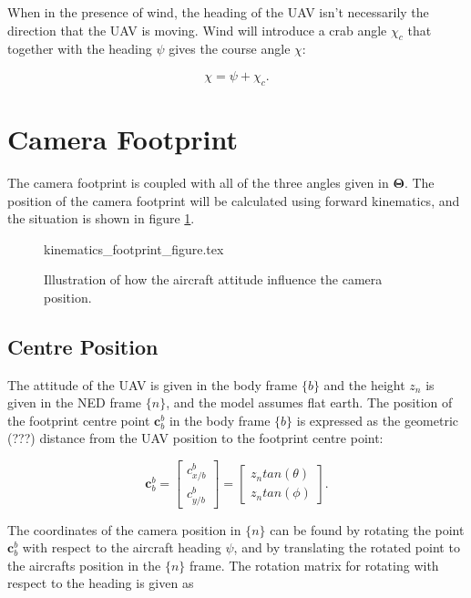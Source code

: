
When in the presence of wind, the heading of the UAV isn't necessarily the direction that the UAV is moving. Wind will introduce a crab angle $\chi_c$ that together with the heading $\psi$ gives the course angle $\chi$:

\begin{equation}
	\chi = \psi + \chi_c.
\end{equation}


\section{Camera Footprint}

The camera footprint is coupled with all of the three angles given in $\bm{\Theta}$. The position of the camera footprint will be calculated using forward kinematics, and the situation is shown in figure \ref{fig:footprint_centre}.

\begin{figure}
	{kinematics_footprint_figure.tex}
	\caption{Illustration of how the aircraft attitude influence the camera position.}
	\label{fig:footprint_centre}
\end{figure}

\subsection{Centre Position}

The attitude of the UAV is given in the body frame $\{b\}$ and the height $z_n$ is given in the NED frame $\{n\}$, and the model assumes flat earth. The position of the footprint centre point $\mathbf{c}_b^b$ in the body frame $\{b\}$ is expressed as the geometric (???) distance from the UAV position to the footprint centre point:

\begin{equation}
	\label{eq:camera_position_body}
	\mathbf{c}_b^b =
	\begin{bmatrix}
		c_{x/b}^b \\ c_{y/b}^b
	\end{bmatrix}
	=
	\begin{bmatrix}
		z_n tan(\theta) \\ z_n tan(\phi)
	\end{bmatrix}.
\end{equation}

The coordinates of the camera position in $\{n\}$ can be found by rotating the point $\mathbf{c}_b^b$ with respect to the aircraft heading $\psi$, and by translating the rotated point to the aircrafts position in the $\{n\}$ frame. The rotation matrix for rotating with respect to the heading is given as


